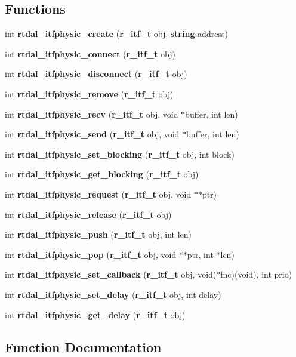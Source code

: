 \subsection*{Functions}
\begin{DoxyCompactItemize}
\item 
int {\bf rtdal\-\_\-itfphysic\-\_\-create} ({\bf r\-\_\-itf\-\_\-t} obj, {\bf string} address)
\item 
int {\bf rtdal\-\_\-itfphysic\-\_\-connect} ({\bf r\-\_\-itf\-\_\-t} obj)
\item 
int {\bf rtdal\-\_\-itfphysic\-\_\-disconnect} ({\bf r\-\_\-itf\-\_\-t} obj)
\item 
int {\bf rtdal\-\_\-itfphysic\-\_\-remove} ({\bf r\-\_\-itf\-\_\-t} obj)
\item 
int {\bf rtdal\-\_\-itfphysic\-\_\-recv} ({\bf r\-\_\-itf\-\_\-t} obj, void $\ast$buffer, int len)
\item 
int {\bf rtdal\-\_\-itfphysic\-\_\-send} ({\bf r\-\_\-itf\-\_\-t} obj, void $\ast$buffer, int len)
\item 
int {\bf rtdal\-\_\-itfphysic\-\_\-set\-\_\-blocking} ({\bf r\-\_\-itf\-\_\-t} obj, int block)
\item 
int {\bf rtdal\-\_\-itfphysic\-\_\-get\-\_\-blocking} ({\bf r\-\_\-itf\-\_\-t} obj)
\item 
int {\bf rtdal\-\_\-itfphysic\-\_\-request} ({\bf r\-\_\-itf\-\_\-t} obj, void $\ast$$\ast$ptr)
\item 
int {\bf rtdal\-\_\-itfphysic\-\_\-release} ({\bf r\-\_\-itf\-\_\-t} obj)
\item 
int {\bf rtdal\-\_\-itfphysic\-\_\-push} ({\bf r\-\_\-itf\-\_\-t} obj, int len)
\item 
int {\bf rtdal\-\_\-itfphysic\-\_\-pop} ({\bf r\-\_\-itf\-\_\-t} obj, void $\ast$$\ast$ptr, int $\ast$len)
\item 
int {\bf rtdal\-\_\-itfphysic\-\_\-set\-\_\-callback} ({\bf r\-\_\-itf\-\_\-t} obj, void($\ast$fnc)(void), int prio)
\item 
int {\bf rtdal\-\_\-itfphysic\-\_\-set\-\_\-delay} ({\bf r\-\_\-itf\-\_\-t} obj, int delay)
\item 
int {\bf rtdal\-\_\-itfphysic\-\_\-get\-\_\-delay} ({\bf r\-\_\-itf\-\_\-t} obj)
\end{DoxyCompactItemize}


\subsection{Function Documentation}
